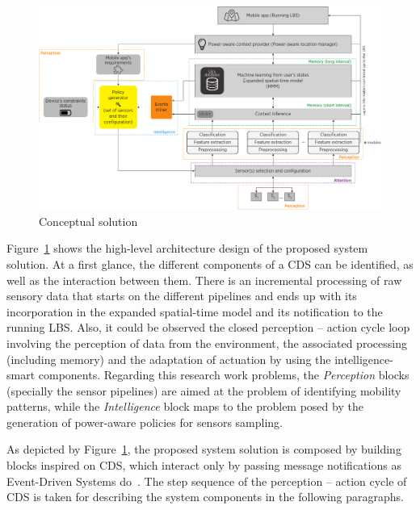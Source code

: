 \documentclass[ENG,PhD]{cinvestav}
\begin{document}
\begin{landscape}
\begin{figure}
  \centering
  \includegraphics[width=\linewidth]{vectors/solution-general-overview}
  \caption{Conceptual solution}
  \label{fig:overall-architecture-of-proposed-system}
\end{figure}
\end{landscape}

Figure~\ref{fig:overall-architecture-of-proposed-system} shows the high-level architecture design of the proposed system solution.
At a first glance, the different components of a CDS can be identified, as well as the interaction between them.
There is an incremental processing of raw sensory data that starts on the different pipelines and ends up with its incorporation in the expanded spatial-time model and its notification to the running LBS.
Also, it could be observed the closed perception -- action cycle loop involving the perception of data from the environment, the associated processing (including memory) and the adaptation of actuation by using the intelligence-smart components.
Regarding this research work problems, the \emph{Perception} blocks (specially the sensor pipelines) are aimed at the problem of identifying mobility patterns, while the \emph{Intelligence} block maps to the problem posed by the generation of power-aware policies for sensors sampling.


As depicted by Figure~\ref{fig:overall-architecture-of-proposed-system}, the proposed system solution is composed by building blocks inspired on CDS, which interact only by passing message notifications as Event-Driven Systems do~\cite{Faison2011,Etzion2011}.
The step sequence of the perception -- action cycle of CDS is taken for describing the system components in the following paragraphs.
\end{document}
